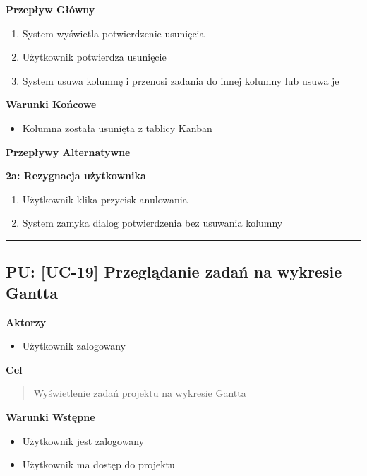 \vspace{0.2cm}
\noindent\textbf{Przepływ Główny}
\begin{enumerate}
    \item System wyświetla potwierdzenie usunięcia
    \item Użytkownik potwierdza usunięcie
    \item System usuwa kolumnę i przenosi zadania do innej kolumny lub usuwa je
\end{enumerate}

\vspace{0.2cm}
\noindent\textbf{Warunki Końcowe}
\begin{itemize}
    \item Kolumna została usunięta z tablicy Kanban
\end{itemize}

\vspace{0.2cm}
\noindent\textbf{Przepływy Alternatywne}

\textbf{2a: Rezygnacja użytkownika}
\begin{enumerate}
    \item Użytkownik klika przycisk anulowania
    \item System zamyka dialog potwierdzenia bez usuwania kolumny
\end{enumerate}


\hrule
\vspace{1cm}

\subsection*{PU: [UC-19] Przeglądanie zadań na wykresie Gantta}

\noindent\textbf{Aktorzy}
\begin{itemize}
    \item Użytkownik zalogowany
\end{itemize}

\vspace{0.2cm}
\noindent\textbf{Cel}
\begin{quote}
    Wyświetlenie zadań projektu na wykresie Gantta
\end{quote}

\vspace{0.2cm}
\noindent\textbf{Warunki Wstępne}
\begin{itemize}
    \item Użytkownik jest zalogowany
    \item Użytkownik ma dostęp do projektu
\end{itemize}

